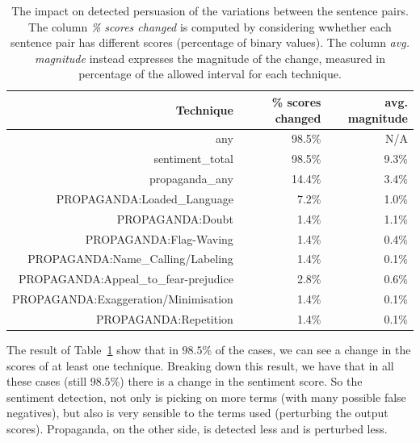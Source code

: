 \begin{table}[!htbp]
    \centering
    \begin{tabular}{r|rr}
         Technique & \% scores changed & avg. magnitude \\
         \hline
         any & 98.5\% & N/A \\
        sentiment\_total & 98.5\% & 9.3\% \\
        propaganda\_any & 14.4\% & 3.4\% \\
        PROPAGANDA:Loaded\_Language & 7.2\% & 1.0\% \\
        PROPAGANDA:Doubt & 1.4\% & 1.1\% \\
        PROPAGANDA:Flag-Waving & 1.4\% & 0.4\% \\
        PROPAGANDA:Name\_Calling/Labeling & 1.4\% & 0.1\% \\
        PROPAGANDA:Appeal\_to\_fear-prejudice & 2.8\% & 0.6\% \\
        PROPAGANDA:Exaggeration/Minimisation & 1.4\% & 0.1\% \\
        PROPAGANDA:Repetition & 1.4\% & 0.1\% \\
    \end{tabular}
    \caption{The impact on detected persuasion of the variations between the sentence pairs. The column \textit{\% scores changed} is computed by considering wwhether each sentence pair has different scores (percentage of binary values). The column \textit{avg. magnitude} instead expresses the magnitude of the change, measured in percentage of the allowed interval for each technique.}
    \label{tab:change_scores_persuasion_in_variations}
\end{table}


The result of Table~\ref{tab:change_scores_persuasion_in_variations} show that in $98.5\%$ of the cases, we can see a change in the scores of at least one technique.
Breaking down this result, we have that in all these cases (still $98.5\%$) there is a change in the sentiment score. So the sentiment detection, not only is picking on more terms (with many possible false negatives), but also is very sensible to the terms used (perturbing the output scores).
Propaganda, on the other side, is detected less and is perturbed less.


